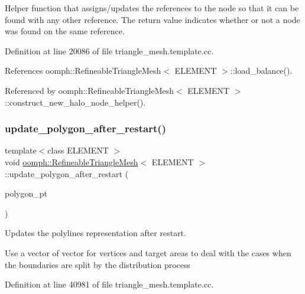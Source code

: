 Helper function that assigns/updates the references to the node so that it can be found with any other reference. The return value indicates whether or not a node was found on the same reference. 



Definition at line 20086 of file triangle\+\_\+mesh.\+template.\+cc.



References oomph\+::\+Refineable\+Triangle\+Mesh$<$ E\+L\+E\+M\+E\+N\+T $>$\+::load\+\_\+balance().



Referenced by oomph\+::\+Refineable\+Triangle\+Mesh$<$ E\+L\+E\+M\+E\+N\+T $>$\+::construct\+\_\+new\+\_\+halo\+\_\+node\+\_\+helper().

\mbox{\label{classoomph_1_1RefineableTriangleMesh_ae1046fa27f50e13ad7081408a341eb20}} 
\subsubsection{\texorpdfstring{update\+\_\+polygon\+\_\+after\+\_\+restart()}{update\_polygon\_after\_restart()}}
{\footnotesize\ttfamily template$<$class E\+L\+E\+M\+E\+NT $>$ \\
void \hyperlink{classoomph_1_1RefineableTriangleMesh}{oomph\+::\+Refineable\+Triangle\+Mesh}$<$ E\+L\+E\+M\+E\+NT $>$\+::update\+\_\+polygon\+\_\+after\+\_\+restart (\begin{DoxyParamCaption}\item[{\hyperlink{classoomph_1_1TriangleMeshPolygon}{Triangle\+Mesh\+Polygon} $\ast$\&}]{polygon\+\_\+pt }\end{DoxyParamCaption})\hspace{0.3cm}{\ttfamily [protected]}}



Updates the polylines representation after restart. 

Use a vector of vector for vertices and target areas to deal with the cases when the boundaries are split by the distribution process 

Definition at line 40981 of file triangle\+\_\+mesh.\+template.\+cc.




